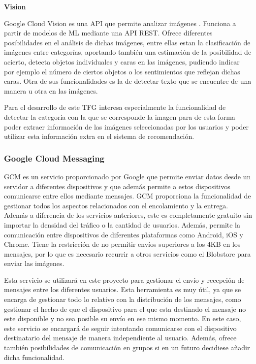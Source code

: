 \textbf{Vision}

Google Cloud Vision es una \acs{API} que permite analizar imágenes \cite{Vision}. Funciona a partir de modelos de \acf{ML} mediante una \acs{API} \acs{REST}. Ofrece diferentes posibilidades en el análisis de dichas imágenes, entre ellas estan la clasificación de imágenes entre categorías, aportando también una estimación de la posibilidad de acierto, detecta objetos individuales y caras en las imágenes, pudiendo indicar por ejemplo el número de ciertos objetos o los sentimientos que reflejan dichas caras. Otra de sus funcionalidades es la de detectar texto que se encuentre de una manera u otra en las imágenes.

Para el desarrollo de este \ac{TFG} interesa especialmente la funcionalidad de detectar la categoría con la que se corresponde la imagen para de esta forma poder extraer información de las imágenes seleccionadas por los usuarios y poder utilizar esta información extra en el sistema de recomendación.


\subsubsection{Google Cloud Messaging}
\ac{GCM} es un servicio proporcionado por Google que permite enviar datos desde un servidor a diferentes dispositivos y que además permite a estos dispositivos comunicarse entre ellos mediante mensajes. \ac{GCM} proporciona la funcionalidad de gestionar todos los aspectos relacionados con el encolamiento y la entrega. Además a diferencia de los servicios anteriores, este es completamente gratuito sin importar la densidad del tráfico o la cantidad de usuarios. Además, permite la comunicación entre dispositivos de diferentes plataformas como Android, iOS y Chrome. Tiene la restricción de no permitir envíos superiores a los 4KB en los mensajes, por lo que es necesario recurrir a otros servicios como el Blobstore para enviar las imágenes.

Esta servicio se utilizará en este proyecto para gestionar el envío y recepción de mensajes entre los diferentes usuarios. Esta herramienta es muy útil, ya que se encarga de gestionar todo lo relativo con la distribución de los mensajes, como gestionar el hecho de que el dispositivo para el que esta destinado el mensaje no este disponible y no sea posible su envío en ese mismo momento. En este caso, este servicio se encargará de seguir intentando comunicarse con el dispositivo destinatario del mensaje de manera independiente al usuario. Además, ofrece también posibilidades de comunicación en grupos si en un futuro decidiese añadir dicha funcionalidad.

